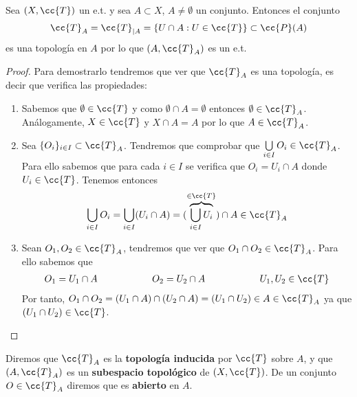 \begin{prop}
    Sea $(X, \cc{T})$ un e.t. y sea $A\subset X$, $A\neq \emptyset$ un conjunto. Entonces el conjunto
    \begin{gather*}
        \cc{T}_A = \cc{T}_{|A}=\{U\cap A : U \in \cc{T}\}\subset \cc{P}(A)
    \end{gather*}
    es una topología en $A$ por lo que $(A, \cc{T}_A)$ es un e.t.

    \begin{proof}
        Para demostrarlo tendremos que ver que $\cc{T}_A$ es una topología, es decir que verifica las propiedades:
        \begin{enumerate}
            \item[\apuntar{A1}] Sabemos que $\emptyset\in \cc{T}$ y como $\emptyset\cap A = \emptyset$ entonces $\emptyset \in \cc{T}_A$. Análogamente, $X\in \cc{T}$ y $X\cap A=A$ por lo que $A\in \cc{T}_A$.
            \item[\apuntar{A2}] Sea $\{O_i\}_{i\in I}\subset \cc{T}_A$. Tendremos que comprobar que $\bigcup\limits_{i\in I}O_i \in \cc{T}_A$. Para ello sabemos que para cada $i\in I$ se verifica que $O_i = U_i\cap A$ donde $U_i \in \cc{T}$. Tenemos entonces 
            \begin{gather*}
                \bigcup\limits_{i\in I}O_i = \bigcup\limits_{i\in I} (U_i \cap A) = (\overbrace{\bigcup\limits_{i\in I} U_i}^{\in \cc{T}}) \cap A \in \cc{T}_A 
            \end{gather*}
            \item[\apuntar{A3}] Sean $O_1, O_2 \in \cc{T}_A$, tendremos que ver que $O_1 \cap O_2 \in \cc{T}_A$. Para ello sabemos que 
            \begin{gather*}
                O_1 = U_1 \cap A \hspace{2cm} O_2 = U_2 \cap A \hspace{2cm} U_1, U_2 \in \cc{T}
            \end{gather*} 
            Por tanto, $O_1 \cap O_2 = (U_1 \cap A) \cap (U_2 \cap A) = (U_1 \cap U_2)\in A \in \cc{T}_A$ ya que $(U_1\cap U_2)\in \cc{T}$.
        \end{enumerate}
    \end{proof}
\end{prop}

\begin{definicion}
    Diremos que $\cc{T}_A$ es la \textbf{topología inducida} por $\cc{T}$ sobre $A$, y que $(A, \cc{T}_A)$ es un \textbf{subespacio topológico} de $(X, \cc{T})$. De un conjunto $O\in \cc{T}_A$ diremos que es \textbf{abierto} en $A$.
    \endsquare
\end{definicion}

